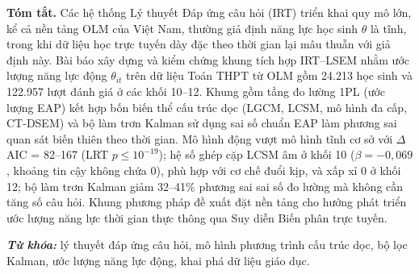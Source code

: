 {\fontsize{10}{12}\selectfont
\setlength{\leftskip}{1cm}\setlength{\rightskip}{1cm}
\noindent\textbf{Tóm tắt.} Các hệ thống Lý thuyết Đáp ứng câu hỏi (IRT) triển khai quy mô lớn, kể cả nền tảng OLM của Việt Nam, thường giả định năng lực học sinh \(\theta\) là tĩnh, trong khi dữ liệu học trực tuyến dày đặc theo thời gian lại mâu thuẫn với giả định này. Bài báo xây dựng và kiểm chứng khung tích hợp IRT--LSEM nhằm ước lượng năng lực động \(\theta_{it}\) trên dữ liệu Toán THPT từ OLM gồm 24{.}213 học sinh và 122{.}957 lượt đánh giá ở các khối 10--12. Khung gồm tầng đo lường 1PL (ước lượng EAP) kết hợp bốn biến thể cấu trúc dọc (LGCM, LCSM, mô hình đa cấp, CT-DSEM) và bộ làm trơn Kalman sử dụng sai số chuẩn EAP làm phương sai quan sát biến thiên theo thời gian. Mô hình động vượt mô hình tĩnh cơ sở với \(\Delta\)AIC = 82--167 (LRT \(p \le 10^{-19}\)); hệ số ghép cặp LCSM âm ở khối 10 (\(\beta = -0{,}069\), khoảng tin cậy không chứa 0), phù hợp với cơ chế đuổi kịp, và xấp xỉ 0 ở khối 12; bộ làm trơn Kalman giảm 32--41\% phương sai sai số đo lường mà không cần tăng số câu hỏi. Khung phương pháp đề xuất đặt nền tảng cho hướng phát triển ước lượng năng lực thời gian thực thông qua Suy diễn Biến phân trực tuyến.\par
\noindent\textbf{\textit{Từ khóa:}} lý thuyết đáp ứng câu hỏi, mô hình phương trình cấu trúc dọc, bộ lọc Kalman, ước lượng năng lực động, khai phá dữ liệu giáo dục.
\par}

\vspace{6pt}
